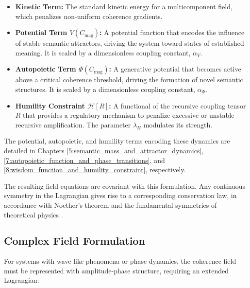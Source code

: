 \begin{itemize}

    \item \textbf{Kinetic Term:} The standard kinetic energy for a multicomponent field, which penalizes non-uniform coherence gradients.

    \item \textbf{Potential Term \(V(C_{\text{mag}})\):} A potential function that encodes the influence of stable semantic attractors, driving the system toward states of established meaning. It is scaled by a dimensionless coupling constant, \(\alpha_V\).

    \item \textbf{Autopoietic Term \(\Phi(C_{\text{mag}})\):} A generative potential that becomes active above a critical coherence threshold, driving the formation of novel semantic structures. It is scaled by a dimensionless coupling constant, \(\alpha_\Phi\).

    \item \textbf{Humility Constraint \(\mathcal{H}[R]\):} A functional of the recursive coupling tensor \(R\) that provides a regulatory mechanism to penalize excessive or unstable recursive amplification. The parameter \(\lambda_H\) modulates its strength.

\end{itemize}

The potential, autopoietic, and humility terms encoding these dynamics are detailed in Chapters \ref{5:semantic_mass_and_attractor_dynamics}, \ref{7:autopoietic_function_and_phase_transitions}, and \ref{8:wisdom_function_and_humility_constraint}, respectively.

The resulting field equations are covariant with this formulation. Any continuous symmetry in the Lagrangian gives rise to a corresponding conservation law, in accordance with Noether's theorem and the fundamental symmetries of theoretical physics \autocite{Noether1918, Lagrange1788, Euler1744, LandauLifshitz1975, PeskinSchroeder1995, Weinberg1995}.


\subsection{Complex Field Formulation}
\label{6.2.1:complex_field_formulation}

For systems with wave-like phenomena or phase dynamics, the coherence field must be represented with amplitude-phase structure, requiring an extended Lagrangian:

